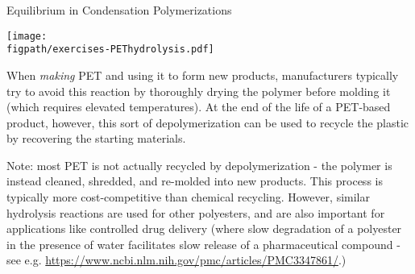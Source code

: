 \begin{activity}{Equilibrium in Condensation Polymerizations}
\begin{exercises}
\begin{solution}
{		\centerline{\texttt{[image: \\figpath/exercises-PEThydrolysis.pdf]}}
				
				When \emph{making} PET and using it to form new products, manufacturers typically try to avoid this reaction by thoroughly drying the polymer before molding it (which requires elevated temperatures). At the end of the life of a PET-based product, however, this sort of depolymerization can be used to recycle the plastic by recovering the starting materials.
				
				Note: most PET is not actually recycled by depolymerization - the polymer is instead cleaned, shredded, and re-molded into new products.  This process is typically more cost-competitive than chemical recycling.  However, similar hydrolysis reactions are used for other polyesters, and are also important for applications like controlled drug delivery (where slow degradation of a polyester in the presence of water facilitates slow release of a pharmaceutical compound - see e.g. \url{https://www.ncbi.nlm.nih.gov/pmc/articles/PMC3347861/}.)
				}
			\end{solution}
			
			
		
		
\end{exercises}
	
\end{activity}